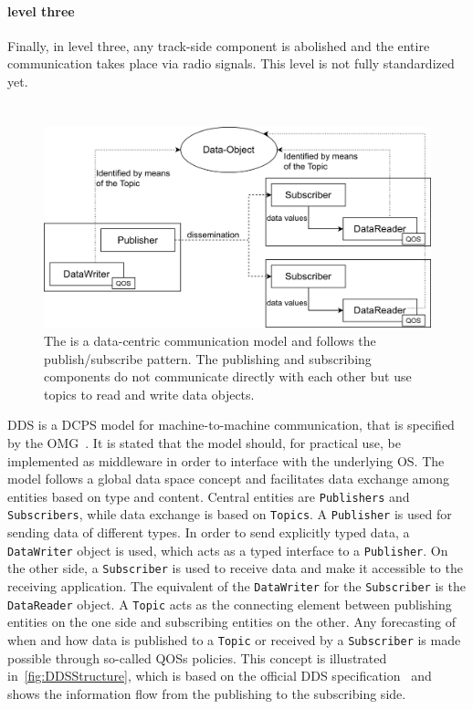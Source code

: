 \paragraph{ level three}
Finally, in  level three, any track-side component is abolished and the entire communication takes place via radio signals.
This  level is not fully standardized yet.

\section{}

\begin{figure}[!hb]
	\centering
	\includegraphics[width=0.8\linewidth]{images/DDSStructure}
	\caption{The  is a data-centric communication model and follows the publish/subscribe pattern. The publishing and subscribing components do not communicate directly with each other but use topics to read and write data objects.}
	\label{fig:DDSStructure}
\end{figure}

\Gls*{DDS} is a \gls*{DCPS} model for machine-to-machine communication, that is specified by the \gls*{OMG}~\cite{omgDDSspec}.
It is stated that the model should, for practical use, be implemented as middleware in order to interface with the underlying \gls*{OS}.
The model follows a global data space concept and facilitates data exchange among entities based on type and content.
Central entities are \texttt{Publishers} and \texttt{Subscribers}, while data exchange is based on \texttt{Topics}.
A \texttt{Publisher} is used for sending data of different types.
In order to send explicitly typed data, a \texttt{DataWriter} object is used, which acts as a typed interface to a \texttt{Publisher}.
On the other side, a \texttt{Subscriber} is used to receive data and make it accessible to the receiving application.
The equivalent of the \texttt{DataWriter} for the \texttt{Subscriber} is the \texttt{DataReader} object.
A \texttt{Topic} acts as the connecting element between publishing entities on the one side and subscribing entities on the other.
Any forecasting of when and how data is published to a \texttt{Topic} or received by a \texttt{Subscriber} is made possible through so-called \glspl*{QOS} policies.
This concept is illustrated in~\autoref{fig:DDSStructure}, which is based on the official \gls*{DDS} specification~\cite{omgDDSspec} and shows the information flow from the publishing to the subscribing side.

